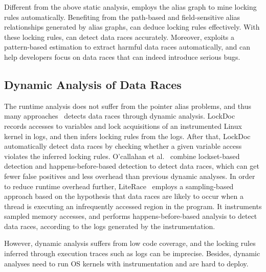 Different from the above static analysis, \sys employs the alias graph to mine 
locking rules automatically. Benefiting from the path-based and field-sensitive 
alias relationships generated by alias graphs, \sys can deduce locking rules 
effectively. With these locking rules, \sys can detect data races accurately. 
Moreover, \sys exploits a pattern-based estimation to extract harmful data 
races automatically, and can help developers focus on data races that can 
indeed introduce serious bugs.

\subsection{Dynamic Analysis of Data Races}
\label{subsec_dynamic}
The runtime analysis does not suffer from the pointer alias problems, and thus 
many approaches~\cite{Lochmann:EuroSys19, Lu:SOSP07, Lu:FSE18, Joshi:ASE08, 	
Liu:NSDI07, Ocallahan:PPoPP03, Serebryany:WBIA09, Marino:PLDI09} detects data 
races through dynamic analysis. LockDoc~\cite{Lochmann:EuroSys19} records 
accesses to variables and lock acquisitions of an instrumented Linux kernel in 
logs, and then infers locking rules from the logs. After that, LockDoc 
automatically detect data races by checking whether a given variable access 
violates the inferred locking rules. O'callahan et al.~\cite{Ocallahan:PPoPP03} 
combine lockset-based detection and happens-before-based detection to detect 
data races, which can get fewer false positives and less overhead than previous 
dynamic analyses. In order to reduce runtime overhead further, 
LiteRace~\cite{Marino:PLDI09} employs a sampling-based approach based on the 
hypothesis that data races are likely to occur when a thread is executing
an infrequently accessed region in the program. It instruments sampled memory 
accesses, and performs happens-before-based analysis to detect data races, 
according to the logs generated by the instrumentation.

However, dynamic analysis suffers from low code coverage, and the locking rules 
inferred through execution traces such as logs can be imprecise. Besides, 
dynamic analyses need to run OS kernels with instrumentation and are hard to 
deploy.


